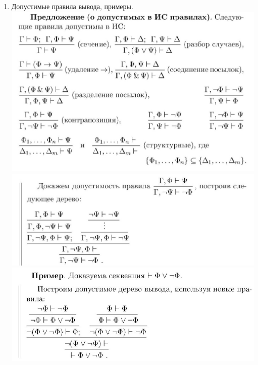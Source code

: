 \documentclass[a4paper]{article}
\theoremstyle{definition}
\begin{document}
\begin{enumerate}
\begin{proof}
        Рассмотрим случай, когда последнее правило в $D$ имеет вид $\frac{\Gamma \vdash \Phi; \Gamma \vdash (\Phi \rightarrow \Psi)}{\Gamma \vdash \Psi}$. Рассмотрим произвольное означивание и покажем, что секвенция $\Gamma \vdash \Psi$ истинна при этом означивании. Если одна из формул в $\Gamma$ ложна, секвенция истинна. Предположим, все формулы в $\Gamma$ истинны. Тогда истинны формулы $\Phi$ и $(\Phi \rightarrow \Psi)$. Ясно, что $\Psi$ тоже истинна.\\
        Остальные правила разбираются аналогично.
       \end{proof}
 \item Допустимые правила вывода, примеры.
       \mbox{}\\ \includegraphics[scale=0.4]{34_1.jpg}\\
       \includegraphics[scale=0.4]{34_2.jpg}\\
       \includegraphics[scale=0.4]{34_3.jpg}

\end{enumerate}
\end{document}
